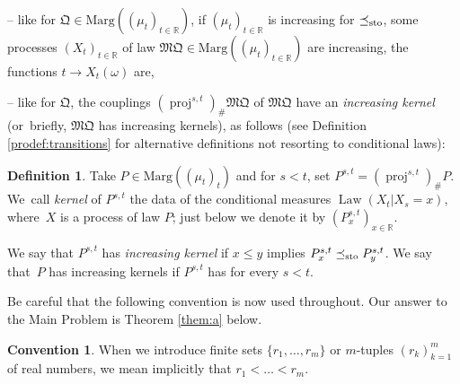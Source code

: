 \documentclass[JEP,XML,SOM,Unicode,NoEqCountersInSection,NoFloatCountersInSection,published]{cedram}
\theoremstyle{plain}
\theoremstyle{definition}
\newtheorem{defi}[them]{Definition}
\newtheorem{convention}[them]{Convention}
\newcommand{\como}{\mathfrak{Q}}
\newcommand{\mq}{\mathfrak{MQ}}
\newcommand{\ma}{\mathrm{Marg}}
\newcommand{\R}{\mathbb{R}}
\newcommand{\law}{\operatorname{Law}}
\newcommand{\leqs}{\preceq_{\text{\rm sto}}}
\newcommand{\pr}{\operatorname{proj}}
\begin{document}
-- like for $\como\in \ma((\mu_t)_{t\in \R})$, if $(\mu_t)_{t\in \R}$ is increasing for $\leqs$, some processes $(X_t)_{t\in\R}$ of law $\mq\in \ma((\mu_t)_{t\in \R})$ are increasing, \ie the functions $t\to X_t(\omega)$ are,

-- like for $\como$, the couplings $(\pr^{s,t})_\#\mq$ of $\mq$ have an \emph{increasing kernel} (or~briefly, $\mq$ has increasing kernels), as follows (see Definition \ref{prodef:transitions} for alternative definitions not resorting to conditional laws):

\begin{defi}\label{defi:increasing_kernel_intro}Take $P\in\ma((\mu_t)_t)$ and for $s<t$, set $P^{s,t}=(\pr^{s,t})_\#P$. We~call \emph{kernel} of $P^{s,t}$ the data of the conditional measures $\law(X_t|X_{s}=x)$, where~$X$ is a process of law $P$; just below we denote it by $(P^{s,t}_x)_{x\in \R}$.

We say that $P^{s,t}$ has \emph{increasing kernel} if $x\leqslant y$ implies $P^{s,t}_x\leqs P^{s,t}_y$. We say that~$P$ has increasing kernels if $P^{s,t}$ has for every $s< t$.
\end{defi}

Be careful that the following convention is now used throughout. Our answer to the Main Problem is Theorem \ref{them:a} below.

\begin{convention}\label{conv:croissant}When we introduce finite sets $\{r_1,\ldots,r_m\}$ or $m$-tuples $(r_k)^m_{k=1}$ of real numbers, we mean implicitly that $r_1<\ldots<r_m$.
\end{convention}
\end{document}
